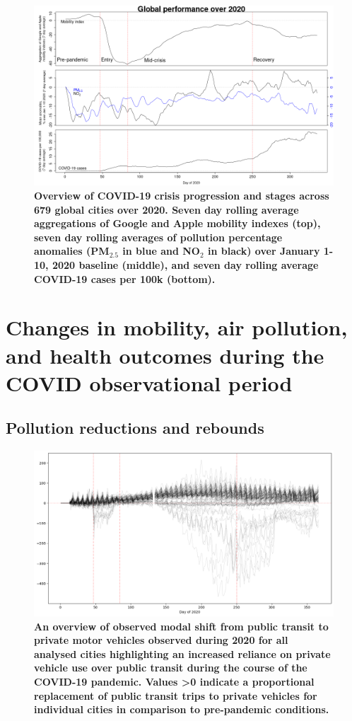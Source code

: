 \documentclass[preprint,10pt]{elsarticle} %
\begin{document}
\begin{figure}
\centering
\includegraphics[trim={0 0 15 20},clip,scale=0.45]{Images/LancetPHOverall.png}
\caption{\bf Overview of COVID-19 crisis progression and stages across 679 global cities over 2020. Seven day rolling average aggregations of Google and Apple mobility indexes (top), seven day rolling averages of pollution percentage anomalies (PM$_{2.5}$ in blue and NO$_{2}$ in black) over January 1-10, 2020 baseline (middle), and seven day rolling average COVID-19 cases per 100k (bottom).}
 \label{fig:stages}
\end{figure}

\section*{\textcolor{OliveGreen}{Changes in mobility, air pollution, and health outcomes during the COVID observational period}}
\subsection*{Pollution reductions and rebounds}

\begin{figure}
\centering
\includegraphics[trim={0 0 0 0},clip,scale=0.4]{Images/DrivingvsTransit.png}
\caption{\bf An overview of observed modal shift from public transit to private motor vehicles observed during 2020 for all analysed cities highlighting an increased reliance on private vehicle use over public transit during the course of the COVID-19 pandemic. Values \textgreater 0 indicate a proportional replacement of public transit trips to private vehicles for individual cities in comparison to pre-pandemic conditions.}  
 \label{fig:driv_trans}
\end{figure}
\end{document}
